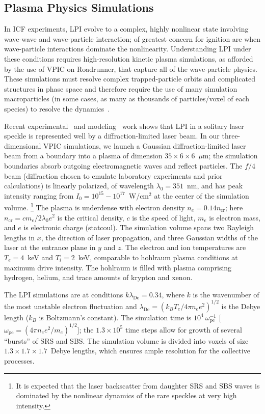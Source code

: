 \documentclass[journal,twoside]{IEEEtran}
\newcommand{\lde}      {\lambda_{\mathrm{De}}}
\newcommand{\wpe}      {\omega_{\mathrm{pe}}}
\begin{document}
\subsection{Plasma Physics Simulations}

In ICF experiments, LPI evolve to a complex, highly nonlinear state
involving wave-wave and wave-particle interaction; of greatest concern
for ignition are when wave-particle interactions dominate the
nonlinearity.  Understanding LPI under these conditions requires
high-resolution kinetic plasma simulations, as afforded by the use of
VPIC on Roadrunner, that capture all of the wave-particle physics.
These simulations must resolve complex trapped-particle orbits and
complicated structures in phase space and therefore require the use of
many simulation macroparticles (in some cases, as many as thousands of
particles/voxel of each species) to resolve the
dynamics~\cite{Yin_et_al_Phys_Plasmas_2006}.

Recent experimental~\cite{Kline_PRL_2005} and
modeling~\cite{Yin_et_al_PRL_2007_SRS} work shows that LPI in a
solitary laser speckle is represented well by a diffraction-limited
laser beam.  In our three-dimensional VPIC simulations, we launch a
Gaussian diffraction-limited laser beam from a boundary into a plasma
of dimension $35 \times 6 \times 6$~$\mu$m; the simulation boundaries
absorb outgoing electromagnetic waves and reflect particles.  The
$f/4$ beam (diffraction chosen to emulate laboratory experiments and
prior calculations) is linearly polarized, of wavelength $\lambda_0 =
351$~nm, and has peak intensity ranging from $I_0 = 10^{15} -
10^{17}$~W/cm$^2$ at the center of the simulation volume.
\footnote{
It is expected that the laser backscatter from daughter SRS and SBS
waves is dominated by the nonlinear dynamics of the rare speckles at
very high intensity.}
The plasma is underdense with electron density $n_e = 0.14
n_{\mathrm{cr}}$; here $n_{\mathrm{cr}} = c m_e / 2 \lambda_0 e^2$ is
the critical density, $c$ is the speed of light, $m_e$ is electron
mass, and $e$ is electronic charge (statcoul).  The simulation volume
spans two Rayleigh lengths in $x$, the direction of laser propagation,
and three Gaussian widths of the laser at the entrance plane in $y$
and $z$.  The electron and ion temperatures are $T_e = 4$~keV and $T_i
= 2$~keV, comparable to hohlraum plasma conditions at maximum drive
intensity.  The hohlraum is filled with plasma comprising hydrogen,
helium, and trace amounts of krypton and xenon.

The LPI simulations are at conditions $k \lde = 0.34$, where $k$ is
the wavenumber of the most unstable electron fluctuation and $\lde =
(k_B T_e / 4 \pi n_e e^2)^{1/2}$ is the Debye length ($k_B$ is
Boltzmann's constant).  The simulation time is $10^4~\wpe^{-1}$ [$\wpe
= (4 \pi n_e e^2 / m_e)^{1/2}$]; the $1.3 \times 10^5$ time steps
allow for growth of several ``bursts'' of SRS and SBS.  The simulation
volume is divided into voxels of size $1.3 \times 1.7 \times
1.7$~Debye lengths, which ensures ample resolution for the collective
processes.
\end{document}
